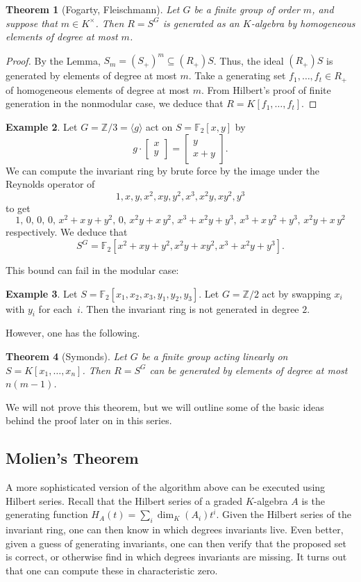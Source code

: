 \documentclass[12pt]{amsart}
\newtheorem{theorem}{Theorem}[section]
\theoremstyle{definition}
\newtheorem{example}[theorem]{Example}
\numberwithin{equation}{theorem}
\def\FF{\mathbb{F}}
\def\ZZ{\mathbb{Z}}
\begin{document}
\begin{theorem}[Fogarty, Fleischmann]
Let $G$ be a finite group of order $m$, and suppose that $m \in K^\times$. Then $R=S^G$ is generated as an $K$-algebra by homogeneous elements of degree at most $m$.
\end{theorem}
\begin{proof}
By the Lemma, $S_m = (S_+)^m \subseteq (R_+) S$. Thus, the ideal $(R_+)S$ is generated by elements of degree at most $m$. Take a generating set $f_1,\dots,f_t \in R_+$ of homogeneous elements of degree at most $m$. From Hilbert's proof of finite generation in the nonmodular case, we deduce that $R=K[f_1,\dots,f_t]$.
\end{proof}

\begin{example}
Let $G=\ZZ/3 = \langle g  \rangle$ act on $S=\FF_2[x,y]$ by
\[ g \cdot \begin{bmatrix} x \\ y \end{bmatrix} =  \begin{bmatrix} y \\ x+y \end{bmatrix}.\]
We can compute the invariant ring by brute force by the image under the Reynolds operator of 
\[ 1, x, y, x^2, xy, y^2, x^3, x^2y, xy^2, y^3\] to get
\[ 1,\,0,\,0,\,0,\,x^{2}+x\,y+y^{2},\,0,\,x^{2}y+x\,y^{2},\,x^{3}+x^{2}y+y^{3},\,x^{3}+x\,y^{2}+y^{3},\,x^{2}y+x\,y^{2}\]
respectively. We deduce that
\[  S^G = \FF_2[ x^{2}+xy+y^{2}, x^{2}y+xy^{2},x^{3}+x^{2}y+y^{3}].\]
\end{example}


This bound can fail in the modular case:

\begin{example}
Let $S=\FF_2[x_1,x_2,x_3,y_1,y_2,y_3]$. Let $G=\ZZ/2$ act by swapping $x_i$ with $y_i$ for each~$i$. Then the invariant ring is not generated in degree $2$.
\end{example} 

However, one has the following.

\begin{theorem}[Symonds]
Let $G$ be a finite group acting linearly on $S=K[x_1,\dots,x_n]$. Then $R=S^G$ can be generated by elements of degree at most $n(m-1)$.
\end{theorem}

We will not prove this theorem, but we will outline some of the basic ideas behind the proof later on in this series.

\subsection*{Molien's Theorem}
A more sophisticated version of the algorithm above can be executed using Hilbert series. Recall that the Hilbert series of a graded $K$-algebra $A$ is the generating function $H_A(t) = \sum_i \dim_{K}(A_i) t^i$. Given the Hilbert series of the invariant ring, one can then know in which degrees invariants live. Even better, given a guess of generating invariants, one can then verify that the proposed set is correct, or otherwise find in which degrees invariants are missing. It turns out that one can compute these in characteristic zero.
\end{document}

